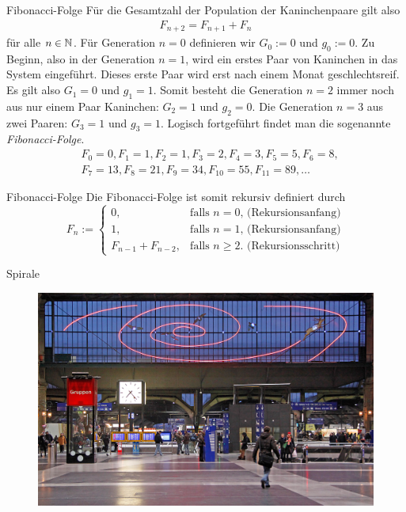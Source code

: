 \begin{frame}[fragile]{Fibonacci-Folge}
Für die Gesamtzahl der Population der Kaninchenpaare gilt also
\begin{align*}
    F_{n+2} = F_{n+1} + F_{n}
\end{align*}
für alle $n\in\mathbb{N}$. Für Generation $n=0$ definieren wir $G_0:=0$ und $g_0:=0$. Zu Beginn, also in der Generation $n=1$, wird ein erstes Paar von Kaninchen in das System eingeführt. Dieses erste Paar wird erst nach einem Monat geschlechtsreif. Es gilt also $G_1=0$ und $g_1=1$. Somit besteht die Generation $n=2$ immer noch aus nur einem Paar Kaninchen: $G_2=1$ und $g_2=0$. Die Generation $n=3$ aus zwei Paaren: $G_3=1$ und $g_3=1$. Logisch fortgeführt findet man die sogenannte \textit{Fibonacci-Folge}.
\begin{align*}
    &F_0 = 0, F_1 = 1, F_2 = 1, F_3 = 2, F_4 = 3, F_5 = 5, F_6 = 8,\\
    &F_7 = 13, F_8 = 21, F_9 = 34, F_{10} = 55, F_{11} = 89, \ldots
\end{align*}
\end{frame}

\begin{frame}[fragile]{Fibonacci-Folge}
Die Fibonacci-Folge ist somit rekursiv definiert durch
\[
  F_n := 
  \begin{cases}
    0, &\text{falls $n=0$, (Rekursionsanfang)} \\
    1, &\text{falls $n=1$, (Rekursionsanfang)} \\
    F_{n-1} + F_{n-2}, & \text{falls  $n\geq 2$. (Rekursionsschritt)}
  \end{cases}
\]
\end{frame}

\begin{frame}[fragile]{Spirale}
\begin{figure}
    \centering
    
\end{figure}
\end{frame}

\begin{frame}[fragile]
\begin{figure}
    \centering
    \includegraphics[width=1\textwidth]{Fibonacci_numbers_in_Zurich_HB.jpg}
\end{figure}
\end{frame}

